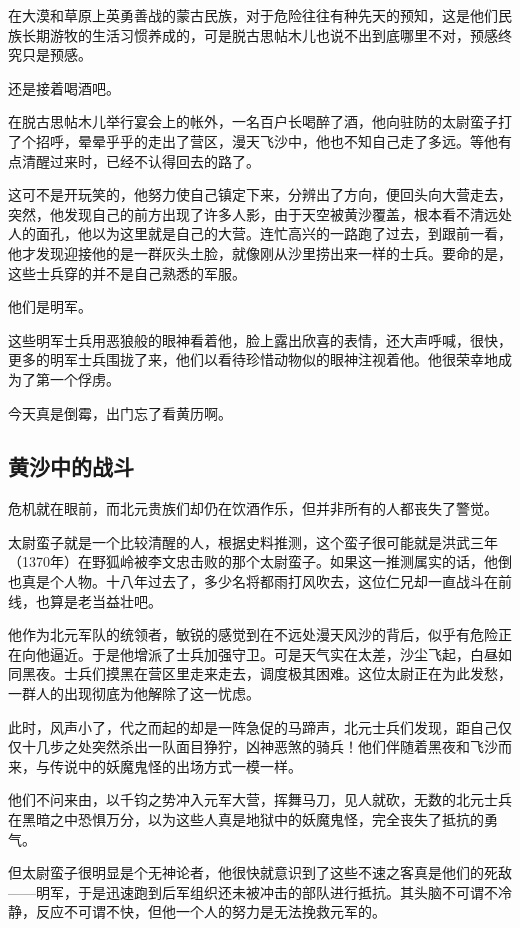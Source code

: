 \begin{multicols}{\theparacolNo}
		在大漠和草原上英勇善战的蒙古民族，对于危险往往有种先天的预知，这是他们民族长期游牧的生活习惯养成的，可是脱古思帖木儿也说不出到底哪里不对，预感终究只是预感。

		还是接着喝酒吧。

		在脱古思帖木儿举行宴会上的帐外，一名百户长喝醉了酒，他向驻防的太尉蛮子打了个招呼，晕晕乎乎的走出了营区，漫天飞沙中，他也不知自己走了多远。等他有点清醒过来时，已经不认得回去的路了。

		这可不是开玩笑的，他努力使自己镇定下来，分辨出了方向，便回头向大营走去，突然，他发现自己的前方出现了许多人影，由于天空被黄沙覆盖，根本看不清远处人的面孔，他以为这里就是自己的大营。连忙高兴的一路跑了过去，到跟前一看，他才发现迎接他的是一群灰头土脸，就像刚从沙里捞出来一样的士兵。要命的是，这些士兵穿的并不是自己熟悉的军服。

		他们是明军。

		这些明军士兵用恶狼般的眼神看着他，脸上露出欣喜的表情，还大声呼喊，很快，更多的明军士兵围拢了来，他们以看待珍惜动物似的眼神注视着他。他很荣幸地成为了第一个俘虏。

		今天真是倒霉，出门忘了看黄历啊。

		\subsection{黄沙中的战斗}
		危机就在眼前，而北元贵族们却仍在饮酒作乐，但并非所有的人都丧失了警觉。

		太尉蛮子就是一个比较清醒的人，根据史料推测，这个蛮子很可能就是洪武三年（1370年）在野狐岭被李文忠击败的那个太尉蛮子。如果这一推测属实的话，他倒也真是个人物。十八年过去了，多少名将都雨打风吹去，这位仁兄却一直战斗在前线，也算是老当益壮吧。

		他作为北元军队的统领者，敏锐的感觉到在不远处漫天风沙的背后，似乎有危险正在向他逼近。于是他增派了士兵加强守卫。可是天气实在太差，沙尘飞起，白昼如同黑夜。士兵们摸黑在营区里走来走去，调度极其困难。这位太尉正在为此发愁，一群人的出现彻底为他解除了这一忧虑。

		此时，风声小了，代之而起的却是一阵急促的马蹄声，北元士兵们发现，距自己仅仅十几步之处突然杀出一队面目狰狞，凶神恶煞的骑兵！他们伴随着黑夜和飞沙而来，与传说中的妖魔鬼怪的出场方式一模一样。

		他们不问来由，以千钧之势冲入元军大营，挥舞马刀，见人就砍，无数的北元士兵在黑暗之中恐惧万分，以为这些人真是地狱中的妖魔鬼怪，完全丧失了抵抗的勇气。

		但太尉蛮子很明显是个无神论者，他很快就意识到了这些不速之客真是他们的死敌——明军，于是迅速跑到后军组织还未被冲击的部队进行抵抗。其头脑不可谓不冷静，反应不可谓不快，但他一个人的努力是无法挽救元军的。


\end{multicols}
